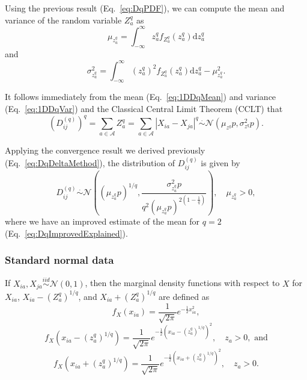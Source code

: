 \documentclass[aos]{imsart}
\begin{document}
Using the previous result (Eq.~\ref{eq:DqPDF}), we can compute the mean and variance of the random variable $Z^q_a$ as
%
\begin{equation}\label{eq:1DDqMean}
\mu_{z^q_a} = \int_{-\infty}^{\infty} z^q_a f_{Z^q_a}(z^q_a) \text{d}z^q_a
\end{equation}
%
and 
%
\begin{equation}\label{eq:1DDqVar}
\sigma^2_{z^q_a} = \int_{-\infty}^{\infty} \left(z^q_a\right)^2 f_{Z^q_a}(z^q_a) \text{d}z^q_a - \mu^2_{z^q_a}.
\end{equation}

It follows immediately from the mean (Eq.~\ref{eq:1DDqMean}) and variance (Eq.~\ref{eq:1DDqVar}) and the Classical Central Limit Theorem (CCLT) that
%
\begin{equation}\label{eq:DqDistr}
\left(D^{(q)}_{ij}\right)^q = \sum_{a \in \mathcal{A}} Z^q_a = \sum_{a \in \mathcal{A}} |X_{ia} - X_{ja}|^q \overset{.}{\sim} \mathcal{N}\left(\mu_{z^q}p,\sigma^2_{z^q}p\right).
\end{equation}

Applying the convergence result we derived previously (Eq.~\ref{eq:DqDeltaMethod}), the distribution of $D^{(q)}_{ij}$ is given by
%
\begin{equation}\label{eq:DDistr}
D^{(q)}_{ij} \overset{.}{\sim} \mathcal{N}\left(\left(\mu_{z^q_a}p\right)^{1/q},\frac{\sigma^2_{z^q_a}p}{q^2\left(\mu_{z^q_a}p\right)^{2\left(1 - \frac{1}{q}\right)}}\right), \quad \mu_{z^q_a} > 0,
\end{equation}
%
where we have an improved estimate of the mean for $q=2$ (Eq.~\ref{eq:DqImprovedExplained}).

\subsubsection{Standard normal data}

If $X_{ia},X_{ja} \overset{iid}{\sim} \mathcal{N}(0,1)$, then the marginal density functions with respect to $X$ for $X_{ia}$, $X_{ia} - \left(Z^q_a\right)^{1/q}$, and $X_{ia} + \left(Z^q_a\right)^{1/q}$ are defined as
%
\begin{equation}\label{eq:normalXmarg}
f_X(x_{ia}) = \frac{1}{\sqrt{2\pi}}e^{-\frac{1}{2}x^2_{ia}},
\end{equation}
%
\begin{equation}\label{eq:normalXMinusZmarg}
f_X\left(x_{ia} - \left(z^q_a\right)^{1/q}\right) = \frac{1}{\sqrt{2\pi}}e^{-\frac{1}{2}\left(x_{ia} - \left(z^q_a\right)^{1/q}\right)^2}, \quad z_a > 0, \text{ and}
\end{equation}
%
\begin{equation}\label{eq:normalXPlusZmarg}
f_X\left(x_{ia} + \left(z^q_a\right)^{1/q}\right) = \frac{1}{\sqrt{2\pi}}e^{-\frac{1}{2}\left(x_{ia} + \left(z^q_a\right)^{1/q}\right)^2}, \quad z_a > 0.
\end{equation}
\end{document}

